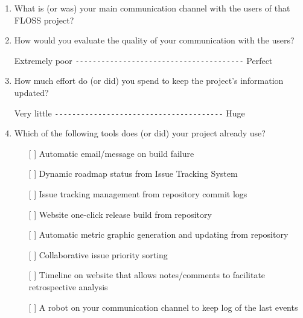 \documentclass[lnbip]{svmultln}
\begin{document}
\begin{enumerate}
\item What is (or was) your main communication channel with the users
  of that FLOSS project?
  \vspace{10pt}

\item How would you evaluate the quality of your communication with
  the users?

  Extremely poor \verb=---------------------------------------=
  Perfect \vspace{10pt}

\item How much effort do (or did) you spend to keep the project's
  information updated?

  Very little \verb=---------------------------------------= Huge
  \vspace{10pt}

\item Which of the following tools does (or did) your project already
  use?
  \begin{itemize}
  \item[[ ] ] Automatic email/message on build failure
  \item[[ ] ] Dynamic roadmap status from Issue Tracking System
  \item[[ ] ] Issue tracking management from repository commit logs
  \item[[ ] ] Website one-click release build from repository
  \item[[ ] ] Automatic metric graphic generation and updating from
    repository
  \item[[ ] ] Collaborative issue priority sorting
  \item[[ ] ] Timeline on website that allows notes/comments to
    facilitate retrospective analysis
  \item[[ ] ] A robot on your communication channel to keep log of the
    last events
  \end{itemize}
  \vspace{10pt}


\end{enumerate}
\end{document}
